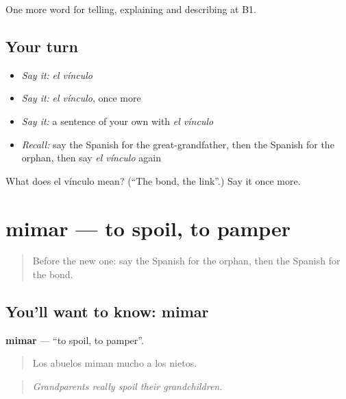 \begin{grammarlens}[title={What you've built}]
One more word for telling, explaining and describing at B1.
\end{grammarlens}

\subsection*{Your turn}
\begin{itemize}
\raggedright
  \item \emph{Say it:} \emph{el vínculo}
  \item \emph{Say it:} \emph{el vínculo}, once more
  \item \emph{Say it:} a sentence of your own with \emph{el vínculo}
  \item \emph{Recall:} say the Spanish for the great-grandfather, then the Spanish for the orphan, then say \emph{el vínculo} again
\end{itemize}

\begin{tcolorbox}[breakable,colback=teal!4,colframe=teal!35!black,title={Before you move on}]
What does el vínculo mean? (\textquotedblleft{}The bond, the link\textquotedblright{}.) Say it once more.
\end{tcolorbox}
\section[mimar]{mimar — to spoil, to pamper}

\label{lesson:ES-C750-mimar}



\begin{quote}
Before the new one: say the Spanish for the orphan, then the Spanish for the bond.
\end{quote}

\subsection*{You'll want to know: mimar}
\textbf{mimar} — \textquotedblleft{}to spoil, to pamper\textquotedblright{}.

\begin{quote}
Los abuelos miman mucho a los nietos.
\end{quote}

\begin{quote}
\emph{Grandparents really spoil their grandchildren.}
\end{quote}

